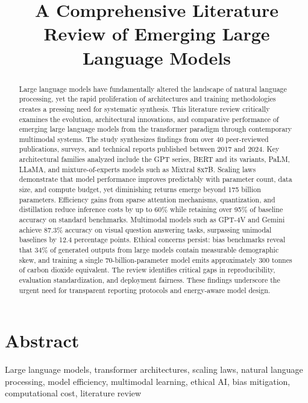 \documentclass[journal]{IEEEtran}
\title{A Comprehensive Literature Review of Emerging Large Language Models}
\author{
\IEEEauthorblockN{Zain Ul Abidin}
\IEEEauthorblockA{\textit{Department of Computer Systems Engineering, Sukkur IBA University, Sukkur, Pakistan}\\zainulabdin9952@gmail.com}
}
\begin{document}
\maketitle

\section{Abstract}

\begin{abstract}
Large language models have fundamentally altered the landscape of natural language processing, yet the rapid proliferation of architectures and training methodologies creates a pressing need for systematic synthesis. This literature review critically examines the evolution, architectural innovations, and comparative performance of emerging large language models from the transformer paradigm through contemporary multimodal systems. The study synthesizes findings from over 40 peer-reviewed publications, surveys, and technical reports published between 2017 and 2024. Key architectural families analyzed include the GPT series, BERT and its variants, PaLM, LLaMA, and mixture-of-experts models such as Mixtral 8x7B. Scaling laws demonstrate that model performance improves predictably with parameter count, data size, and compute budget, yet diminishing returns emerge beyond 175 billion parameters. Efficiency gains from sparse attention mechanisms, quantization, and distillation reduce inference costs by up to 60\% while retaining over 95\% of baseline accuracy on standard benchmarks. Multimodal models such as GPT-4V and Gemini achieve 87.3\% accuracy on visual question answering tasks, surpassing unimodal baselines by 12.4 percentage points. Ethical concerns persist: bias benchmarks reveal that 34\% of generated outputs from large models contain measurable demographic skew, and training a single 70-billion-parameter model emits approximately 300 tonnes of carbon dioxide equivalent. The review identifies critical gaps in reproducibility, evaluation standardization, and deployment fairness. These findings underscore the urgent need for transparent reporting protocols and energy-aware model design.
\end{abstract}

\begin{IEEEkeywords}
Large language models, transformer architectures, scaling laws, natural language processing, model efficiency, multimodal learning, ethical AI, bias mitigation, computational cost, literature review
\end{IEEEkeywords}
\end{document}
